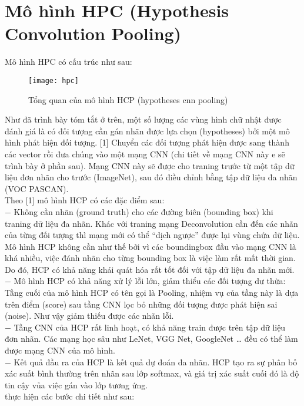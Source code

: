 \documentclass[13pt, a4paper]{extreport}
\begin{document}
\section{Mô hình HPC (Hypothesis Convolution Pooling)}
\indent Mô hình HPC có cấu trúc như sau:
\begin{figure}[H]
  \centering
    \texttt{[image: hpc]}
   \caption{\large Tổng quan của mô hình HCP (hypotheses cnn pooling)}
\end{figure}
\indent Như đã trình bày tóm tắt ở trên, một số lượng các vùng hình chữ nhật được đánh giá là có đối tượng cần gán nhãn được lựa chọn (hypotheses) bởi một mô hình phát hiện đối tượng. [1] Chuyển các đối tượng phát hiện được sang thành các vector rồi đưa chúng vào một mạng CNN (chi tiết về mạng CNN này e sẽ trình bày ở phần sau). Mạng CNN này sẽ được cho traning trước từ một tập dữ liệu đơn nhãn cho trước (ImageNet), sau đó điều chỉnh bằng tập dữ liệu đa nhãn (VOC PASCAN).\\
\indent Theo [1] mô hình HCP có các đặc điểm sau:\\
\indent $-$ Không cần nhãn (ground truth) cho các đường biên (bounding box)  khi traning dữ liệu đa nhãn. Khác với traning mạng Deconvolution cần đến các nhãn của từng đối tượng thì mạng mới có thể “dịch ngược” được lại vùng chứa dữ liệu. Mô hình HCP không cần như thế bởi vì các boundingbox đầu vào mạng CNN là khá nhiều, việc đánh nhãn cho từng bounding box là việc làm rất mất thời gian. Do đó, HCP có khả năng khái quát hóa rất tốt đối với tập dữ liệu đa nhãn mới.\\
\indent $-$ Mô hình HCP có khả năng xử lý lỗi lớn, giảm thiểu các đối tượng dư thừa: Tầng cuối của mô hình HCP có tên gọi là Pooling, nhiệm vụ của tầng này là dựa trên điểm (score) sau tầng CNN lọc bỏ những đối tượng được phát hiện sai (noise). Như vậy giảm thiếu được các nhãn lỗi.\\
\newpage
\indent $-$ Tầng CNN của HCP rất linh hoạt, có khả năng train được trên tập dữ liệu đơn nhãn. Các mạng học sâu như LeNet, VGG Net, GoogleNet … đều có thể làm được mạng CNN của mô hình.\\
\indent $-$ Kết quả đầu ra của HCP là kết quả dự đoán đa nhãn. HCP tạo ra sự phân bố xác suất bình thường trên nhãn sau lớp softmax, và giá trị xác suất cuối đó là độ tin cậy vủa việc gán vào lớp tương ứng.\\
\indent [1] thực hiện các bước chi tiết như sau:
\end{document}
